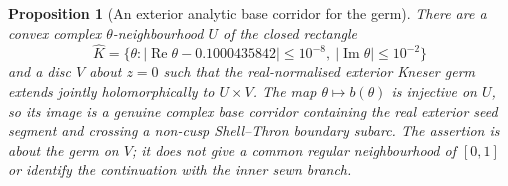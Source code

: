 \documentclass[11pt,a4paper]{article}
\newtheorem{proposition}[theorem]{Proposition}
\theoremstyle{definition}
\begin{document}
\begin{proposition}[An exterior analytic base corridor for the germ]
\label{prop:exterior-analytic-germ-corridor}
There are a convex complex $\theta$-neighbourhood $U$ of the closed
rectangle
\[
 \widehat K=\{\theta:|\operatorname{Re}\theta-0.1000435842|
       \le10^{-8},\ |\operatorname{Im}\theta|\le10^{-2}\}
\]
and a disc $V$ about $z=0$ such that the real-normalised exterior Kneser germ
extends jointly holomorphically to $U\times V$.  The map
$\theta\mapsto b(\theta)$ is injective on $U$, so its image is a
genuine complex base corridor containing the real exterior seed
segment and crossing a non-cusp Shell--Thron boundary subarc.
The assertion is about the germ on $V$; it does not give a common
regular neighbourhood of $[0,1]$ or identify the continuation with
the inner sewn branch.
\end{proposition}
\end{document}
